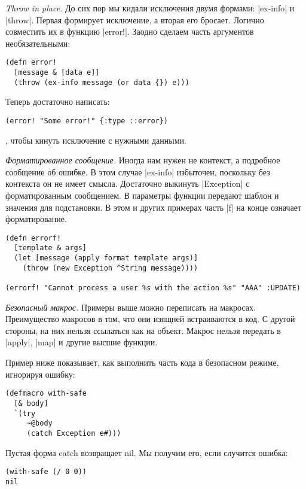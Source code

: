 \emph{Throw in place.} До сих пор мы кидали исключения двумя формами: \spverb|ex-info| и
\spverb|throw|. Первая формирует исключение, а вторая его бросает. Логично совместить
их в функцию \spverb|error!|. Заодно сделаем часть аргументов необязательными:

\begin{verbatim}
(defn error!
  [message & [data e]]
  (throw (ex-info message (or data {}) e)))
\end{verbatim}

Теперь достаточно написать:

\begin{verbatim}
(error! "Some error!" {:type ::error})
\end{verbatim}

, чтобы кинуть исключение с нужными данными.

\emph{Форматированное сообщение.} Иногда нам нужен не контекст, а подробное
сообщение об ошибке. В этом случае \spverb|ex-info| избыточен, поскольку без контекста
он не имеет смысла. Достаточно выкинуть \spverb|Exception| с форматированным
сообщением. В параметры функции передают шаблон и значения для подстановки. В
этом и других примерах часть \spverb|f| на конце означает форматирование.

\begin{verbatim}
(defn errorf!
  [template & args]
  (let [message (apply format template args)]
    (throw (new Exception ^String message))))

(errorf! "Cannot process a user %s with the action %s" "AAA" :UPDATE)
\end{verbatim}

\emph{Безопасный макрос.} Примеры выше можно переписать на макросах. Преимущество
макросов в том, что они изящней встраиваются в код. С другой стороны, на них
нельзя ссылаться как на объект. Макрос нельзя передать в \spverb|apply|, \spverb|map| и другие
высшие функции.

Пример ниже показывает, как выполнить часть кода в безопасном режиме, игнорируя
ошибку:

\begin{verbatim}
(defmacro with-safe
  [& body]
  `(try
     ~@body
     (catch Exception e#)))
\end{verbatim}

Пустая форма catch возвращает nil. Мы получим его, если случится ошибка:

\begin{verbatim}
(with-safe (/ 0 0))
nil
\end{verbatim}

